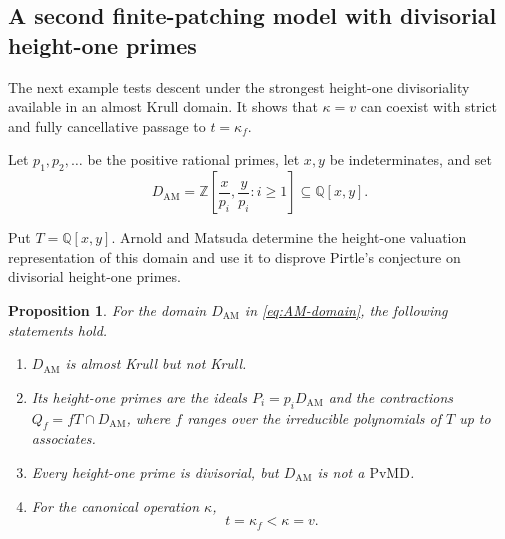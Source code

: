 \documentclass[11pt]{amsart}
\newtheorem{proposition}[proposition]{Proposition}
\theoremstyle{definition}
\theoremstyle{remark}
\newcommand{\PvMD}{\mathrm{PvMD}}
\begin{document}
\subsection{A second finite-patching model with divisorial height-one primes}

The next example tests descent under the strongest height-one divisoriality
available in an almost Krull domain.  It shows that $\kappa=v$ can coexist
with strict and fully cancellative passage to $t=\kappa_f$.

Let $p_1,p_2,\ldots$ be the positive rational primes, let $x,y$ be
indeterminates, and set
\begin{equation}\label{eq:AM-domain}
 D_{\mathrm{AM}}
 =\mathbb Z\left[\frac{x}{p_i},\frac{y}{p_i}:i\geq1\right]
 \subseteq \mathbb Q[x,y].
\end{equation}

Put $T=\mathbb Q[x,y]$.  Arnold and Matsuda determine the height-one
valuation representation of this domain and use it to disprove Pirtle's
conjecture on divisorial height-one primes.

\begin{proposition}\label{prop:AM-structure}
For the domain $D_{\mathrm{AM}}$ in \eqref{eq:AM-domain}, the following
statements hold.
\begin{enumerate}[label=\textup{(\roman*)}]
\item $D_{\mathrm{AM}}$ is almost Krull but not Krull.
\item Its height-one primes are the ideals $P_i=p_iD_{\mathrm{AM}}$ and the
      contractions $Q_f=fT\cap D_{\mathrm{AM}}$, where $f$ ranges over the
      irreducible polynomials of $T$ up to associates.
\item Every height-one prime is divisorial, but $D_{\mathrm{AM}}$ is not a
      $\PvMD$.
\item For the canonical operation $\kappa$,
      \begin{equation}\label{eq:AM-kappa}
       t=\kappa_f<\kappa=v.
      \end{equation}
\end{enumerate}
\end{proposition}
\end{document}
